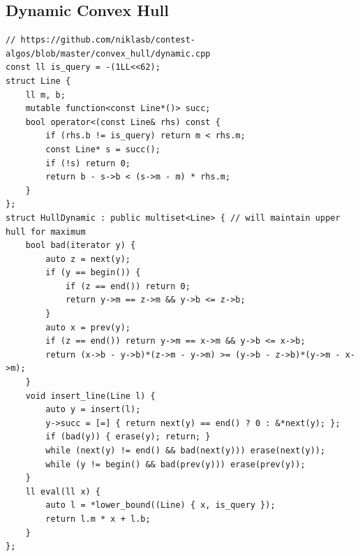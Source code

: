 \documentclass[landscape, 8pt, a4paper, oneside, twocolumn]{extarticle}
\begin{document}
\subsection{Dynamic Convex Hull}
\begin{verbatim}
// https://github.com/niklasb/contest-algos/blob/master/convex_hull/dynamic.cpp
const ll is_query = -(1LL<<62);
struct Line {
    ll m, b;
    mutable function<const Line*()> succ;
    bool operator<(const Line& rhs) const {
        if (rhs.b != is_query) return m < rhs.m;
        const Line* s = succ();
        if (!s) return 0;
        return b - s->b < (s->m - m) * rhs.m;
    }
};
struct HullDynamic : public multiset<Line> { // will maintain upper hull for maximum
    bool bad(iterator y) {
        auto z = next(y);
        if (y == begin()) {
            if (z == end()) return 0;
            return y->m == z->m && y->b <= z->b;
        }
        auto x = prev(y);
        if (z == end()) return y->m == x->m && y->b <= x->b;
        return (x->b - y->b)*(z->m - y->m) >= (y->b - z->b)*(y->m - x->m);
    }
    void insert_line(Line l) {
        auto y = insert(l);
        y->succ = [=] { return next(y) == end() ? 0 : &*next(y); };
        if (bad(y)) { erase(y); return; }
        while (next(y) != end() && bad(next(y))) erase(next(y));
        while (y != begin() && bad(prev(y))) erase(prev(y));
    }
    ll eval(ll x) {
        auto l = *lower_bound((Line) { x, is_query });
        return l.m * x + l.b;
    }
};
\end{verbatim}
\end{document}
